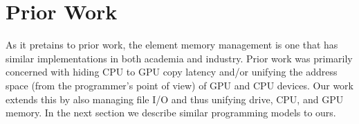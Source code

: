 \section{Prior Work}

As it pretains to prior work, the element memory management
	is one that has similar implementations in both academia
	and industry.
Prior work was primarily concerned with hiding CPU
	to GPU copy latency \cite{gmac} and/or unifying the 
	address space (from the programmer's point of view)
	of GPU and CPU devices.
Our work extends this by also managing file I/O and thus
	unifying drive, CPU, and GPU memory.
In the next section we describe similar programming models
	to ours.